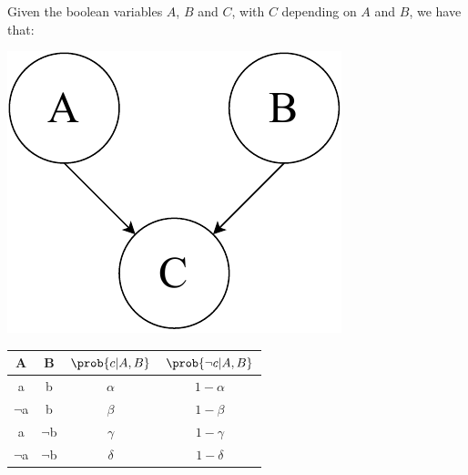 \begin{description}
\begin{description}
                \begin{example} 
                    Given the boolean variables $A$, $B$ and $C$, with $C$ depending on $A$ and $B$, we have that:\\
                    \begin{minipage}{.48\linewidth}
                        \centering
                        \includegraphics[width=0.35\linewidth]{img/_cpt_graph.pdf}
                    \end{minipage}
                    \begin{minipage}{.48\linewidth}
                        \centering
                        \begin{tabular}{c|c|c|c}
                            A           & B         & $\prob{c \vert A, B}$ & $\prob{\lnot c \vert A, B}$ \\
                            \hline
                            a           & b         & $\alpha$ & $1-\alpha$ \\
                            $\lnot$a    & b         & $\beta$ & $1-\beta$ \\
                            a           & $\lnot$b  & $\gamma$ & $1-\gamma$ \\
                            $\lnot$a    & $\lnot$b  & $\delta$ & $1-\delta$ \\
                        \end{tabular}
                    \end{minipage}
                \end{example}
        \end{description}


\end{description}
